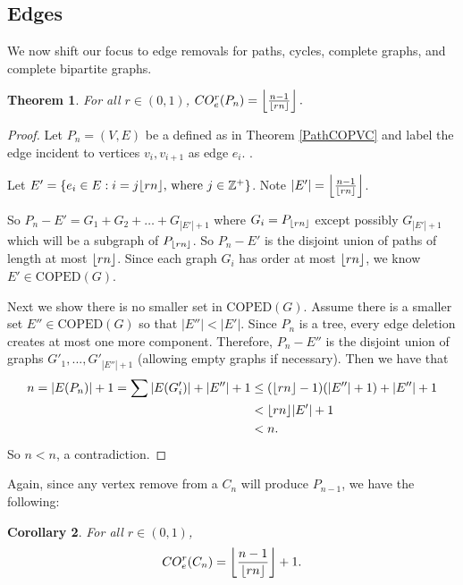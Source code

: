 \documentclass[12pt]{article}
\DeclarePairedDelimiter{\floor}{\lfloor}{\rfloor}
\newtheorem{theorem}{Theorem}[section]
\newtheorem{corollary}[theorem]{Corollary}
\theoremstyle{definition}
\newcommand{\BZ}{\mathbb Z}
\newcommand{\COEDS}{\text{COPED}}
\newcommand{\COE}[2]{CO^{#1}_{e}(#2)}
\begin{document}
\subsection{Edges}
We now shift our focus to edge removals for paths, cycles, complete graphs, and complete bipartite graphs. 

\begin{theorem} \label{PathCOEVC}
 For all $r \in (0,1)$, $\COE{r}{P_n}=\left\lfloor \frac{n-1}{\floor{rn}} \right\rfloor.$
\end{theorem}

\begin{proof}
Let $P_n = (V, E)$ be a defined as in Theorem \ref{PathCOPVC} and label the edge incident to vertices $v_i, v_{i+1}$ as edge $e_i$. . 

Let $E' = \{e_i \in E: i = j\floor{rn} \text{, where } j \in \BZ^+ \}$. Note $|E'|=\left\lfloor \frac{n-1}{\floor{rn}} \right\rfloor$.

So $P_n-E' = G_1 + G_2 + \ldots + G_{|E'|+1}$
where $G_i = P_{\floor{rn}}$ except possibly $G_{|E'|+1}$ which will be a subgraph of $P_{\floor{rn}}$. So $P_n-E'$ is the disjoint union of paths of length at most $\floor{rn}$. Since each graph $G_i$ has order at most $\floor{rn}$, we know $E' \in \COEDS(G)$. 

Next we show there is no smaller set in $\COEDS(G)$. 
Assume there is a smaller set $E'' \in \COEDS(G)$ so that $|E''| < |E'|.$
Since $P_n$ is a tree, every edge deletion creates at most one more component. Therefore, $P_{n}-E''$ is the disjoint union of graphs $G'_{1},...,G'_{|E''|+1}$ (allowing empty graphs if necessary). Then we have that 
\begin{align*}
  n=|E(P_{n})|+1=\sum |E(G'_{i})|+|E''|+1 &\le (\floor{rn}-1)(|E''|+1)+|E''|+1\\
  & < \floor{rn}|E'|+1\\
  & < n.
\end{align*}
So $n<n$, a contradiction. 
\end{proof}

Again, since any vertex remove from a $C_n$ will produce $P_{n-1}$, we have the following: 

\begin{corollary}
 For all $r \in (0,1)$, $$\COE{r}{C_n}=\left\lfloor \frac{n-1}{\floor{rn}} \right\rfloor +1.$$ 
\end{corollary}
\end{document}
